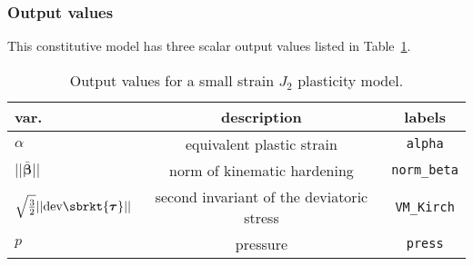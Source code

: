 \subsubsection{Output values}
This constitutive model has three scalar output values listed in
Table~\ref{tab.mat.FD.J2.C0.Hardening.output}.
\begin{table}[h]
\caption{\label{tab.mat.FD.J2.C0.Hardening.output} Output values 
for a small strain $J_2$ plasticity model.}
\begin{center}
\begin{tabular}[c]{|l|c|c|}
\hline
 \parbox[c]{1.00in}{\centering \textbf{var.}}
&\parbox[c]{3.0in}{\raggedright \textbf{description}}
&\parbox[c]{1.0in}{\raggedright  \textbf{labels}}\\
\hline
\parbox[c]{1.00in}{\centering $\alpha$} & 
\parbox[c]{3.0in}{\raggedright equivalent plastic strain} &
\parbox[c]{1.0in}{\raggedright \texttt{alpha}}\\
\hline
\parbox[c]{1.00in}{\centering $||\bar{\boldsymbol{\beta}}||$} & 
\parbox[c]{3.0in}{\raggedright norm of kinematic hardening} &
\parbox[c]{1.0in}{\raggedright \texttt{norm\_beta}}\\
\hline
\parbox[c]{1.00in}{\centering 
$\sqrt{\frac{3}{2}}||\textrm{dev}\sbrkt{\boldsymbol{\tau}}||$}  & 
\parbox[c]{3.0in}{\raggedright second invariant of the deviatoric stress} &
\parbox[c]{1.0in}{\raggedright \texttt{VM\_Kirch}}\\
\hline
\parbox[c]{1.00in}{\centering $p$}  & 
\parbox[c]{3.0in}{\raggedright pressure} &
\parbox[c]{1.0in}{\raggedright \texttt{press}}\\
\hline
\end{tabular}
\end{center}
\end{table}

